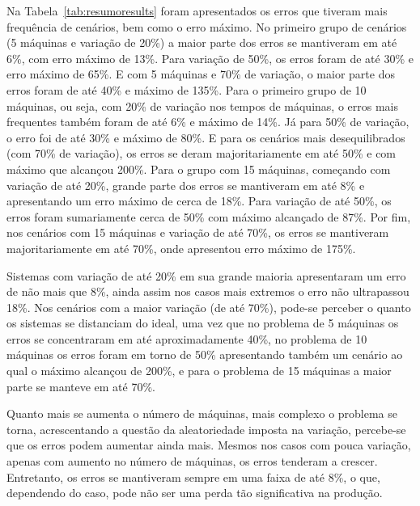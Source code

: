     Na Tabela~\ref{tab:resumoresults} foram apresentados os erros que tiveram mais frequência de cenários, bem como o erro máximo. No primeiro grupo de cenários (5 máquinas e variação de 20\%) a maior parte dos erros se mantiveram em até 6\%, com erro máximo de 13\%. Para variação de 50\%, os erros foram de até 30\% e erro máximo de 65\%. E com 5 máquinas e 70\% de variação, o maior parte dos erros foram de até 40\% e máximo de 135\%. Para o primeiro grupo de 10 máquinas, ou seja, com 20\% de variação nos tempos de máquinas, o erros mais frequentes também foram de até 6\% e máximo de 14\%. Já para 50\% de variação, o erro foi de até 30\% e máximo de 80\%. E para os cenários mais desequilibrados (com 70\% de variação), os erros se deram majoritariamente em até 50\% e com máximo que alcançou 200\%. Para o grupo com 15 máquinas, começando com variação de até 20\%, grande parte dos erros se mantiveram em até 8\% e apresentando um erro máximo de cerca de 18\%. Para variação de até 50\%, os erros foram sumariamente cerca de 50\% com máximo alcançado de 87\%. Por fim, nos cenários com 15 máquinas e variação de até 70\%, os erros se mantiveram majoritariamente em até 70\%, onde apresentou erro máximo de 175\%.
    
    
    
    Sistemas com variação de até 20\% em sua grande maioria apresentaram um erro de não mais que 8\%, ainda assim nos casos mais extremos o erro não ultrapassou 18\%. Nos cenários com a maior variação (de até 70\%), pode-se perceber o quanto os sistemas se distanciam do ideal, uma vez que no problema de 5 máquinas os erros se concentraram em até aproximadamente 40\%, no problema de 10 máquinas os erros foram em torno de 50\% apresentando também um cenário ao qual o máximo alcançou de 200\%, e para o problema de 15 máquinas a maior parte se manteve em até 70\%.
    
    Quanto mais se aumenta o número de máquinas, mais complexo o problema se torna, acrescentando a questão da aleatoriedade imposta na variação, percebe-se que os erros podem aumentar ainda mais. Mesmos nos casos com pouca variação, apenas com aumento no número de máquinas, os erros tenderam a crescer. Entretanto, os erros se mantiveram sempre em uma faixa de até 8\%, o que, dependendo do caso, pode não ser uma perda tão significativa na produção. 
    
    






